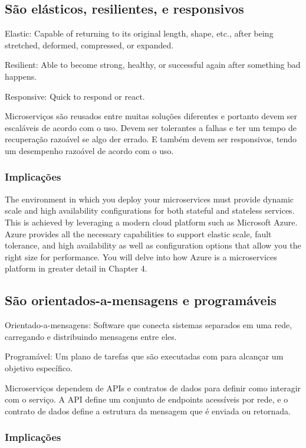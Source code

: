 \subsection{São elásticos, resilientes, e responsivos}

Elastic: Capable of returning to its original length, shape, etc., after being stretched, deformed, compressed, or expanded.

Resilient: Able to become strong, healthy, or successful again after something bad happens.

Responsive: Quick to respond or react.

Microserviços são reusados entre muitas soluções diferentes e portanto devem ser escaláveis de acordo com o uso. Devem ser tolerantes a falhas e ter um tempo de recuperação razoável se algo der errado. E também devem ser responsivos, tendo um desempenho razoável de acordo com o uso.

\subsubsection*{Implicações}

The environment in which you deploy your microservices must provide dynamic scale and high availability configurations for both stateful and stateless services. This is achieved by leveraging a modern cloud platform such as Microsoft Azure. Azure provides all the necessary capabilities to support elastic scale, fault tolerance, and high availability as well as configuration options that allow you the right size for performance. You will delve into how Azure is a microservices platform in greater detail in Chapter 4.

\subsection{São orientados-a-mensagens e programáveis}

Orientado-a-mensagens: Software que conecta sistemas separados em uma rede, carregando e distribuindo mensagens entre eles.

Programável: Um plano de tarefas que são executadas com para alcançar um objetivo específico.

Microserviços dependem de APIs e contratos de dados para definir como interagir com o serviço. A API define um conjunto de endpoints acessíveis por rede, e o contrato de dados define a estrutura da mensagem que é enviada ou retornada.

\subsubsection{Implicações}

